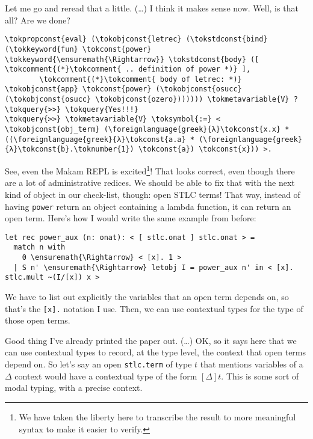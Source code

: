 \heroSTUDENT{} Let me go and reread that a little. (\ldots{}) I think it makes
sense now. Well, is that all? Are we done?

\begin{verbatim}
\tokpropconst{eval} (\tokobjconst{letrec} (\tokstdconst{bind} (\tokkeyword{fun} \tokconst{power} \tokkeyword{\ensuremath{\Rightarrow}} \tokstdconst{body} ([ \tokcomment{(*}\tokcomment{ .. definition of power *)} ],
        \tokcomment{(*}\tokcomment{ body of letrec: *)} \tokobjconst{app} \tokconst{power} (\tokobjconst{osucc} (\tokobjconst{osucc} \tokobjconst{ozero})))))) \tokmetavariable{V} ?
\tokquery{>>} \tokquery{Yes!!!}
\tokquery{>>} \tokmetavariable{V} \toksymbol{:=} < \tokobjconst{obj_term} (\foreignlanguage{greek}{λ}\tokconst{x.x} * ((\foreignlanguage{greek}{λ}\tokconst{a.a} * (\foreignlanguage{greek}{λ}\tokconst{b}.\toknumber{1}) \tokconst{a}) \tokconst{x})) >.
\end{verbatim}

\heroADVISOR{} See, even the Makam REPL is
excited\footnote{We have taken the liberty here to transcribe the result to more meaningful syntax to make it easier to verify.}!
That looks correct, even though there are a lot of administrative
redices. We should be able to fix that with the next kind of object in
our check-list, though: open STLC terms! That way, instead of having
\texttt{power} return an object containing a lambda function, it can
return an open term. Here's how I would write the same example from
before:

\begin{verbatim}
let rec power_aux (n: onat): < [ stlc.onat ] stlc.onat > =
  match n with
    0 \ensuremath{\Rightarrow} < [x]. 1 >
  | S n' \ensuremath{\Rightarrow} letobj I = power_aux n' in < [x]. stlc.mult ~(I/[x]) x >
\end{verbatim}

\noindent
We have to list out explicitly the variables that an open term depends
on, so that's the \texttt{{[}x{]}.} notation I use. Then, we can use
contextual types \citep{nanevski2008contextual} for the type of those
open terms.

\heroSTUDENT{} Good thing I've already printed the paper out. (\ldots{}) OK,
so it says here that we can use contextual types to record, at the type
level, the context that open terms depend on. So let's say an open
\texttt{stlc.term} of type \(t\) that mentions variables of a \(\Delta\)
context would have a contextual type of the form \([\Delta] t\). This is
some sort of modal typing, with a precise context.

